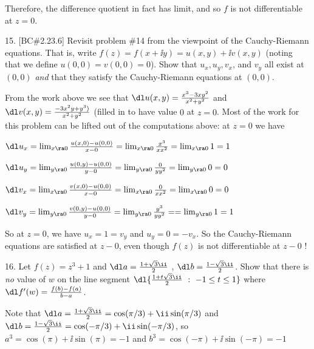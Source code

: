 \msk
\item{} 
Therefore, the difference quotient in fact has  limit, and so $f$
is not differentiable at $z=0$.

\bsk

\item{15.} [BC\#2.23.6] Revisit problem \#14 from the viewpoint of the Cauchy-Riemann equations. 
That is, write $f(z)=f(x+\ii y)=u(x,y)+\ii v(x,y)$ (noting that we define $u(0,0)=v(0,0)=0$). 
Show that $u_x,u_y,v_x$, and $v_y$ all exist at $(0,0)$ {\it and} that they satisfy the
Cauchy-Riemann equations at $(0,0)$. 

\msk

\item{} From the work above we see that $\dl u(x,y)={{x^3-3xy^2}\over{x^2+y^2}}$
and $\dl v(x,y)={{-3x^2y+y^3)}\over{x^2+y^2}}$ (filled in to have value $0$ at $z=0$.
Most of the work for this problem can be lifted out of the computations above: at $z=0$ 
we have 

\msk

$\dl u_x=\lim_{x\ra 0} {{u(x,0)-u(0,0)}\over{x-0}}=\lim_{x\ra 0}{{x^3}\over{xx^2}}=\lim_{x\ra 0} 1 = 1$

$\dl u_y=\lim_{y\ra 0} {{u(0,y)-u(0,0)}\over{y-0}}=\lim_{y\ra 0}{{0}\over{yy^2}}=\lim_{y\ra 0} 0 = 0$

$\dl v_x=\lim_{x\ra 0} {{v(x,0)-u(0,0)}\over{x-0}}=\lim_{x\ra 0}{{0}\over{xx^2}}=\lim_{x\ra 0} 0 = 0$

$\dl v_y=\lim_{y\ra 0} {{v(0,y)-u(0,0)}\over{y-0}}=\lim_{y\ra 0}{{y^3}\over{yy^2}}==\lim_{y\ra 0} 1 = 1$

\ssk

\item{} So at $z=0$, we have $u_x=1=v_y$ and $u_y=0=-v_x$. So the Cauchy-Riemann equations are satisfied at
$z-0$, even though $f(z)$ is not differentiable at $z-0$ !

\bsk


\item{16.} Let $f(z)=z^3+1$ and $\dl a={{1+\sqrt{3}\ii}\over{2}}$ , $\dl b={{1-\sqrt{3}\ii}\over{2}}$.
Show that there is {\it no} value of $w$ on the  line segment 
$\dl\{ {{1+t\sqrt{3}\ii}\over{2}}\ :\ -1\leq t\leq 1\}$
where $\dl f^\prime(w)={{f(b)-f(a)}\over{b-a}}$.

\msk

\item{} Note that $\dl a={{1+\sqrt{3}\ii}\over{2}}=\cos(\pi/3)+\ii\sin(\pi/3)$
and $\dl b={{1-\sqrt{3}\ii}\over{2}}=\cos(-\pi/3)+\ii\sin(-\pi/3)$, 
so $a^3=\cos(\pi)+\ii\sin(\pi)=-1$ and $b^3=\cos(-\pi)+\ii\sin(-\pi)=-1$

